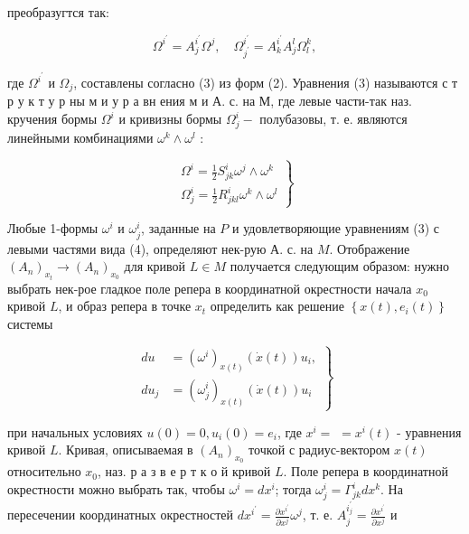 \documentclass[10pt]{article}
\begin{document}
преобразугтся так:



\[

\Omega^{i^{\prime}}=A_{j}^{i^{\prime}} \Omega^{j}, \quad \Omega_{j^{\prime}}^{i^{\prime}}=A_{k}^{i^{\prime}} A_{j}^{l} \Omega_{l}^{k},

\]



где $\Omega^{i^{\prime}}$ и $\Omega_{j}$, составлены согласно (3) из форм (2). Уравнения (3) называются с т р у к т у р ны м и у р а вн ения м и А. с. на М, где левые части-так наз. кручения бормы $\Omega^{i}$ и кривизны бормы $\Omega_{j}^{i}-$ полубазовы, т. е. являются линейными комбинациями $\omega^{k} \wedge \omega^{l}$ :



\[

\left.\begin{array}{l}

\Omega^{i}=\frac{1}{2} S_{j k}^{i} \omega^{j} \wedge \omega^{k} \\

\Omega_{j}^{i}=\frac{1}{2} R_{j k l}^{i} \omega^{k} \wedge \omega^{l}

\end{array}\right\}

\]



Любые 1-формы $\omega^{i}$ и $\omega_{j}^{i}$, заданные на $P$ и удовлетворяющие уравнениям (3) с левыми частями вида (4), определяют нек-рую А. с. на $M$. Отображение $\left(A_{n}\right)_{x_{t}} \rightarrow\left(A_{n}\right)_{x_{0}}$ для кривой $L \in M$ получается следующим образом: нужно выбрать нек-рое гладкое поле репера в координатной окрестности начала $x_{0}$ кривой $L$, и образ репера в точке $x_{t}$ определить как решение $\left\{x(t), e_{i}(t)\right\}$ системы



\[

\left.\begin{array}{rl}

d u & =\left(\omega^{i}\right)_{x(t)}(\dot{x}(t)) u_{i}, \\

d u_{j} & =\left(\omega_{j}^{i}\right)_{x(t)}(\dot{x}(t)) u_{i}

\end{array}\right\}

\]



при начальных условиях $u(0)=0, u_{i}(0)=e_{i}$, где $x^{i}=$ $=x^{i}(t)$ - уравнения кривой $L$. Кривая, описываемая в $\left(A_{n}\right)_{x_{0}}$ точкой с радиус-вектором $x(t)$ относительно $x_{0}$, наз. р а з в е р т к о й кривой $L$. Поле репера в координатной окрестности можно выбрать так, чтобы $\omega^{i}=d x^{i}$; тогда $\omega_{j}^{i}=\Gamma_{j k}^{i} d x^{k}$. На пересечении координатных окрестностей $d x^{i^{\prime}}=\frac{\partial x^{i^{\prime}}}{\partial x^{j}} \omega^{j}$, т. е. $A_{j}^{i_{j}^{\prime}}=\frac{\partial x^{i^{\prime}}}{\partial x^{j}}$ и
\end{document}
